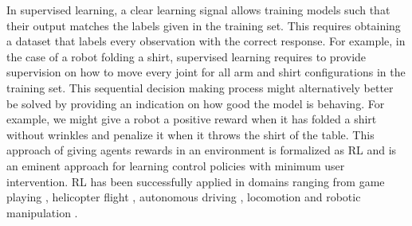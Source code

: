\documentclass[\home/main.tex]{subfiles}
\begin{document}

In supervised learning, a clear learning signal allows training models such that their output matches the labels given in the training set. This requires obtaining a dataset that labels every observation with the correct response. For example, in the case of a robot folding a shirt, supervised learning requires to provide supervision on how to move every joint for all arm and shirt configurations in the training set. This sequential decision making process might alternatively better be solved by providing an indication on how good the model is behaving. For example, we might give a robot a positive reward when it has folded a shirt without wrinkles and penalize it when it throws the shirt of the table. This approach of giving agents rewards in an environment is formalized as \gls{RL} and is an eminent approach for learning control policies with minimum user intervention. RL has been successfully applied in domains ranging from game playing \autocite{mnih2015human}, helicopter flight \autocite{ng2003autonomous}, autonomous driving \autocite{sallab2017deep}, locomotion \autocite{tan2018sim} and robotic manipulation \autocite{levine2016end}.
\end{document}
